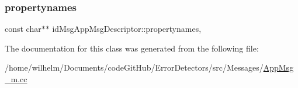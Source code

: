 \subsubsection{\texorpdfstring{propertynames}{propertynames}}
{\footnotesize\ttfamily const char$\ast$$\ast$ id\+Msg\+App\+Msg\+Descriptor\+::propertynames\hspace{0.3cm}{\ttfamily [mutable]}, {\ttfamily [private]}}



The documentation for this class was generated from the following file\+:\begin{DoxyCompactItemize}
\item 
/home/wilhelm/\+Documents/code\+Git\+Hub/\+Error\+Detectors/src/\+Messages/\hyperlink{_app_msg__m_8cc}{App\+Msg\+\_\+m.\+cc}\end{DoxyCompactItemize}
